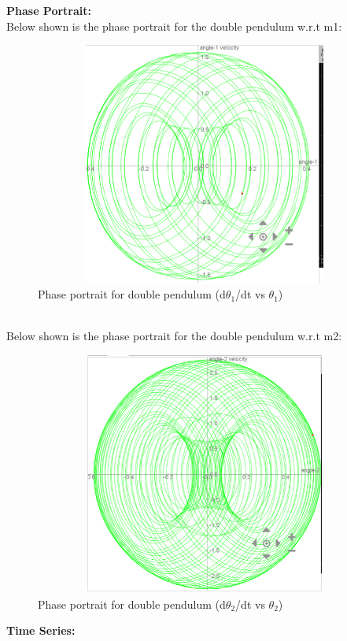 \documentclass[11pt]{scrartcl} %
\begin{document}
\textbf{Phase Portrait:}\\
Below shown is the phase portrait for the double pendulum w.r.t m1:
\begin{figure}[h] %
	\centering
	\includegraphics[width=12cm, height=8cm]{Figures/M 4b l is 1.png} %
	\caption{Phase portrait for double pendulum (d$\theta_{1}$/dt vs $\theta_{1}$)}
\end{figure}
\\
Below shown is the phase portrait for the double pendulum w.r.t m2:
\begin{figure}[h] %
	\centering
	\includegraphics[width=12cm, height=8cm]{Figures/M 4b when l is 1.png} %
	\caption{Phase portrait for double pendulum (d$\theta_{2}$/dt vs $\theta_{2}$)}
\end{figure}
\newpage
\textbf{Time Series:}\\
\end{document}

